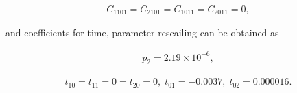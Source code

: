 \documentclass[openacc]{rsproca_new}%
\begin{document}
\begin{appendices}
\begin{align}
C_{1101}=C_{2101}=C_{1011}=C_{2011}=0,
\end{align}

\noindent and coefficients for time, parameter rescailing can be obtained as

\begin{align}
p_2=2.19\times10^{-6},
\end{align}

\begin{align}
t_{10}=t_{11}=0=t_{20}=0,\;t_{01}=-0.0037, \; t_{02}=0.000016.
\end{align}

\end{appendices}






\end{document}

